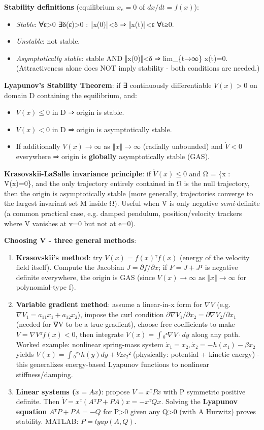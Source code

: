 \documentclass[11pt]{article}
\begin{document}
\textbf{Stability definitions} (equilibrium $x_e=0$ of $dx/dt=f(x)$):
\begin{itemize}
\item \textit{Stable}: ∀ε>0 ∃δ(ε)>0 : ‖x(0)‖<δ ⇒ ‖x(t)‖<ε ∀t≥0.
\item \textit{Unstable}: not stable.
\item \textit{Asymptotically stable}: stable AND ‖x(0)‖<δ ⇒ lim\_\allowbreak{}\{t→∞\} x(t)=0. (Attractiveness alone does NOT imply stability - both conditions are needed.)
\end{itemize}

\textbf{Lyapunov's Stability Theorem}: if ∃ continuously differentiable $V(x)>0$ on domain D containing the equilibrium, and:
\begin{itemize}
\item $\dot{V}(x) ≤ 0$ in D ⇒ origin is stable.
\item $\dot{V}(x) < 0$ in D ⇒ origin is asymptotically stable.
\item If additionally $V(x)→∞$ as $‖x‖→∞$ (radially unbounded) and $\dot{V}<0$ everywhere ⇒ origin is \textbf{globally} asymptotically stable (GAS).
\end{itemize}

\textbf{Krasovskii-LaSalle invariance principle}: if $\dot{V}(x) ≤ 0$ and Ω = \{x : V̇(x)=0\}, and the only trajectory entirely contained in Ω is the null trajectory, then the origin is asymptotically stable (more generally, trajectories converge to the largest invariant set M inside Ω). Useful when V̇ is only negative \textit{semi}-definite (a common practical case, e.g. damped pendulum, position/velocity trackers where V̇ vanishes at v=0 but not at e=0).

\textbf{Choosing V - three general methods}:
\begin{enumerate}
\item \textbf{Krasovskii's method}: try $V(x) = f(x)ᵀ f(x)$ (energy of the velocity field itself). Compute the Jacobian $J = ∂f/∂x$; if $F = J + Jᵀ$ is negative definite everywhere, the origin is GAS (since $V(x)→∞$ as $‖x‖→∞$ for polynomial-type f).
\item \textbf{Variable gradient method}: assume a linear-in-x form for $∇V$ (e.g. $∇V₁ = a₁₁x₁+a₁₂x₂$), impose the curl condition $∂∇V₁/∂x₂ = ∂∇V₂/∂x₁$ (needed for ∇V to be a true gradient), choose free coefficients to make $\dot{V} = ∇Vᵀf(x) < 0$, then integrate $V(x) = ∫₀ˣ ∇V·dy$ along any path. Worked example: nonlinear spring-mass system $\dot{x}₁=x₂, \dot{x}₂=-h(x₁)-βx₂$ yields $V(x) = ∫₀^{x₁} h(y)dy + ½x₂²$ (physically: potential + kinetic energy) - this generalizes energy-based Lyapunov functions to nonlinear stiffness/damping.
\item \textbf{Linear systems ($\dot{x}=Ax$)}: propose $V=xᵀPx$ with P symmetric positive definite. Then $\dot{V} = xᵀ(AᵀP+PA)x = -xᵀQx$. Solving the \textbf{Lyapunov equation} $AᵀP + PA = -Q$ for P>0 given any Q>0 (with A Hurwitz) proves stability. MATLAB: $P = lyap(A,Q)$.
\end{enumerate}
\end{document}
